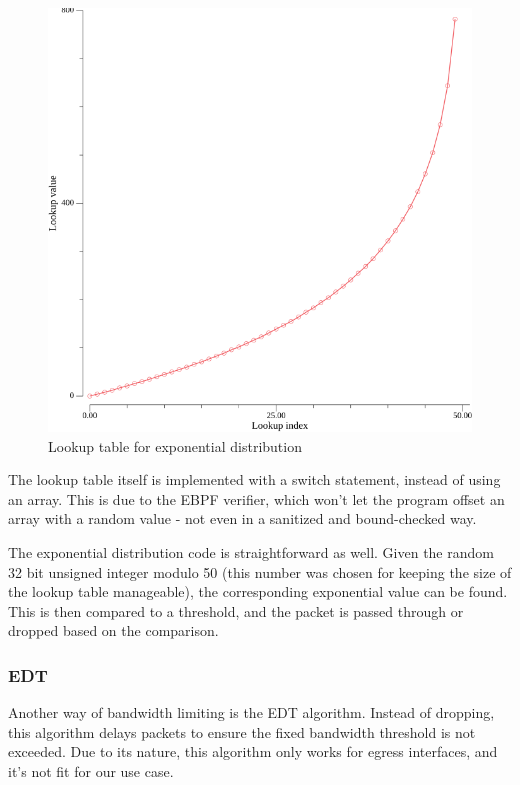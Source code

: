 \begin{figure}[H]
	\centering
	\includegraphics[width=\textwidth]{images/lookuptable.png}
	\caption{Lookup table for exponential distribution}
	\label{fig:exp-lookup-table}
\end{figure}

The lookup table itself is implemented with a switch statement, instead of using an array. This is due to the EBPF verifier, which won't let the program offset an array with a random value - not even in a sanitized and bound-checked way.

The exponential distribution code is straightforward as well. Given the random 32 bit unsigned integer modulo 50 (this number was chosen for keeping the size of the lookup table manageable), the corresponding exponential value can be found. This is then compared to a threshold, and the packet is passed through or dropped based on the comparison.


\subsubsection{EDT}
Another way of bandwidth limiting is the EDT algorithm. Instead of dropping, this algorithm delays packets to ensure the fixed bandwidth threshold is not exceeded. Due to its nature, this algorithm only works for egress interfaces, and it's not fit for our use case.

